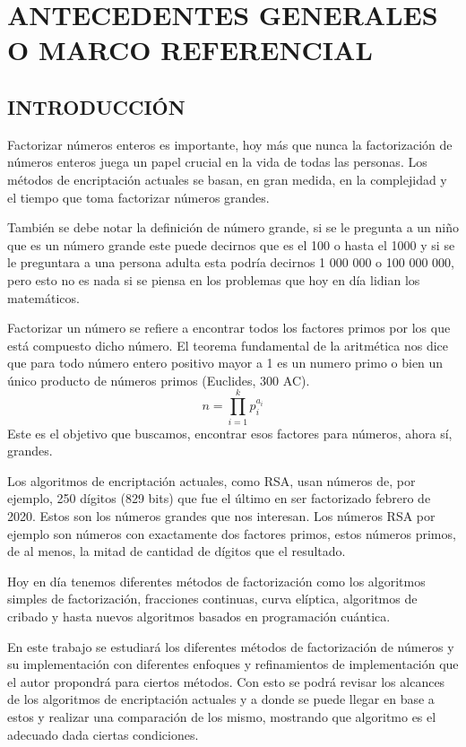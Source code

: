 \chapter{ANTECEDENTES GENERALES O MARCO REFERENCIAL}
    \section{INTRODUCCIÓN}


    Factorizar números enteros es importante, hoy más que nunca la factorización de números enteros juega un papel crucial en la vida de todas las personas. Los métodos de encriptación actuales se basan, en gran medida, en la complejidad y el tiempo que toma factorizar números grandes.

    También se debe notar la definición de número grande, si se le pregunta a un niño que es un número grande este puede decirnos que es el 100 o hasta el 1000 y si se le preguntara a una persona adulta esta podría decirnos 1 000 000 o 100 000 000, pero esto no es nada si se piensa en los problemas que hoy en día lidian los matemáticos.

    Factorizar un número se refiere a encontrar todos los factores primos por los que está compuesto dicho número. El teorema fundamental de la aritmética nos dice que para todo número entero positivo mayor a 1 es un numero primo o bien un único producto de números primos (Euclides, 300 AC).
    \[
    n = \prod_{i=1}^{k}p_{i}^{a_{i}}
    \]
    Este es el objetivo que buscamos, encontrar esos factores para números, ahora sí, grandes.

    Los algoritmos de encriptación actuales, como RSA, usan números de, por ejemplo, 250 dígitos (829 bits) que fue el último en ser factorizado febrero de 2020. Estos son los números grandes que nos interesan. Los números RSA por ejemplo son números con exactamente dos factores primos, estos números primos, de al menos, la mitad de cantidad de dígitos que el resultado.

    Hoy en día tenemos diferentes métodos de factorización como los algoritmos simples de factorización, fracciones continuas, curva elíptica, algoritmos de cribado y hasta nuevos algoritmos basados en programación cuántica.

    En este trabajo se estudiará los diferentes métodos de factorización de números y su implementación con diferentes enfoques y refinamientos de implementación que el autor propondrá para ciertos métodos. Con esto se podrá revisar los alcances de los algoritmos de encriptación actuales y a donde se puede llegar en base a estos y realizar una comparación de los mismo, mostrando que algoritmo es el adecuado dada ciertas condiciones.
